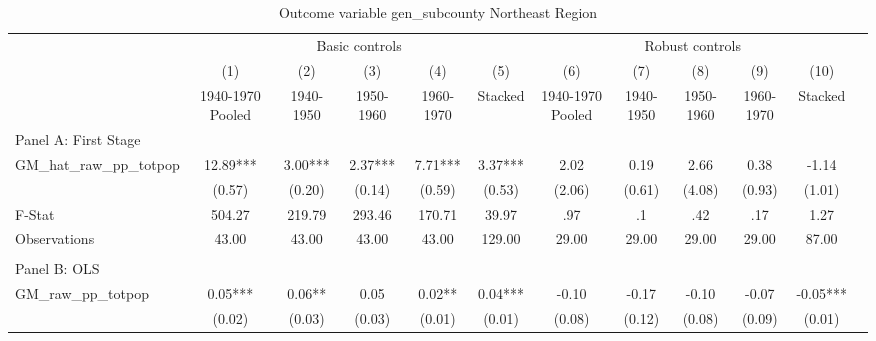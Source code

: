  \begin{table}[htbp]\centering {} \begin{threeparttable} \caption{Outcome variable gen\_subcounty Northeast Region} \begin{tabular}{l*{11}{c}} \toprule
          &\multicolumn{5}{c}{Basic controls}                                   &\multicolumn{5}{c}{Robust controls}                                  \\\cmidrule(lr){2-6}\cmidrule(lr){7-11}
          &\multicolumn{1}{c}{(1)}&\multicolumn{1}{c}{(2)}&\multicolumn{1}{c}{(3)}&\multicolumn{1}{c}{(4)}&\multicolumn{1}{c}{(5)}&\multicolumn{1}{c}{(6)}&\multicolumn{1}{c}{(7)}&\multicolumn{1}{c}{(8)}&\multicolumn{1}{c}{(9)}&\multicolumn{1}{c}{(10)}\\
          &\multicolumn{1}{c}{1940-1970 Pooled}&\multicolumn{1}{c}{1940-1950}&\multicolumn{1}{c}{1950-1960}&\multicolumn{1}{c}{1960-1970}&\multicolumn{1}{c}{Stacked}&\multicolumn{1}{c}{1940-1970 Pooled}&\multicolumn{1}{c}{1940-1950}&\multicolumn{1}{c}{1950-1960}&\multicolumn{1}{c}{1960-1970}&\multicolumn{1}{c}{Stacked}\\
\cmidrule(lr){1-11}
\multicolumn{10}{l}{Panel A: First Stage}\\
\cmidrule(lr){1-11}
GM\_hat\_raw\_pp\_totpop&     12.89***&      3.00***&      2.37***&      7.71***&      3.37***&      2.02   &      0.19   &      2.66   &      0.38   &     -1.14   \\
          &    (0.57)   &    (0.20)   &    (0.14)   &    (0.59)   &    (0.53)   &    (2.06)   &    (0.61)   &    (4.08)   &    (0.93)   &    (1.01)   \\
\midrule
F-Stat    &    504.27   &    219.79   &    293.46   &    170.71   &     39.97   &       .97   &        .1   &       .42   &       .17   &      1.27   \\
Observations&     43.00   &     43.00   &     43.00   &     43.00   &    129.00   &     29.00   &     29.00   &     29.00   &     29.00   &     87.00   \\
\cmidrule[\heavyrulewidth](lr){1-11} \\ \cmidrule[\heavyrulewidth](lr){1-11}
\multicolumn{10}{l}{Panel B: OLS}\\
\cmidrule(lr){1-11}
GM\_raw\_pp\_totpop&      0.05***&      0.06** &      0.05   &      0.02** &      0.04***&     -0.10   &     -0.17   &     -0.10   &     -0.07   &     -0.05***\\
          &    (0.02)   &    (0.03)   &    (0.03)   &    (0.01)   &    (0.01)   &    (0.08)   &    (0.12)   &    (0.08)   &    (0.09)   &    (0.01)   \\

\end{tabular}
\end{threeparttable}
\end{table}
